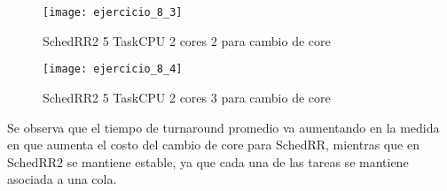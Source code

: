\begin{figure}[H]
\caption{SchedRR2 5 TaskCPU 2 cores 2 para cambio de core}
\texttt{[image: ejercicio\_8\_3]}
\end{figure}


\begin{figure}[H]
\caption{SchedRR2 5 TaskCPU 2 cores 3  para cambio de core}
\texttt{[image: ejercicio\_8\_4]}
\end{figure}

Se observa que el tiempo de turnaround promedio va aumentando en la medida en que aumenta el costo del cambio de core para SchedRR, mientras que en SchedRR2 se mantiene estable, ya que cada una de las tareas se mantiene asociada a una cola.
